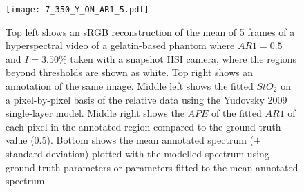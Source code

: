 \begin{figure}[h!]
    \centering 
    \texttt{[image: 7\_350\_Y\_ON\_AR1\_5.pdf]}
    \caption{Top left shows an sRGB reconstruction of the mean of 5 frames of a hyperspectral video of a gelatin-based phantom where $AR1=0.5$ and $I=3.50\%$ taken with a snapshot HSI camera, where the regions beyond thresholds are shown as white. Top right shows an annotation of the same image. Middle left shows the fitted $StO_2$ on a pixel-by-pixel basis of the relative data using the Yudovsky 2009 single-layer model. Middle right shows the $APE$ of the fitted $AR1$ of each pixel in the annotated region compared to the ground truth value (0.5). Bottom shows the mean annotated spectrum ($\pm$ standard deviation) plotted with the modelled spectrum using ground-truth parameters or parameters fitted to the mean annotated spectrum.}
    \label{fig:gelatinpbpeg5}
\end{figure}

\FloatBarrier
